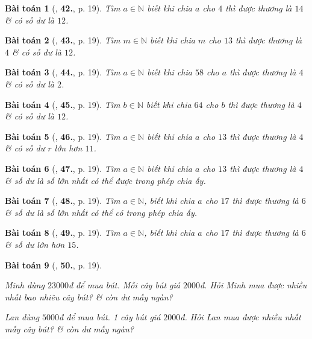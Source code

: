 \documentclass{article}
\numberwithin{equation}{section}
\newtheorem{baitoan}{Bài toán}[section]
\begin{document}
\begin{baitoan}[\cite{Trong_Toan_6_2021}, \textbf{42.}, p. 19]
	Tìm $a\in\mathbb{N}$ biết khi chia $a$ cho $4$ thì được thương là $14$ \& có số dư là $12$.
\end{baitoan}

\begin{baitoan}[\cite{Trong_Toan_6_2021}, \textbf{43.}, p. 19]
	Tìm $m\in\mathbb{N}$ biết khi chia $m$ cho $13$ thì được thương là $4$ \& có số dư là $12$.
\end{baitoan}

\begin{baitoan}[\cite{Trong_Toan_6_2021}, \textbf{44.}, p. 19]
	Tìm $a\in\mathbb{N}$ biết khi chia $58$ cho $a$ thì được thương là $4$ \& có số dư là $2$.
\end{baitoan}

\begin{baitoan}[\cite{Trong_Toan_6_2021}, \textbf{45.}, p. 19]
	Tìm $b\in\mathbb{N}$ biết khi chia $64$ cho $b$ thì được thương là $4$ \& có số dư là $12$.
\end{baitoan}

\begin{baitoan}[\cite{Trong_Toan_6_2021}, \textbf{46.}, p. 19]
	Tìm $a\in\mathbb{N}$ biết khi chia $a$ cho $13$ thì được thương là $4$ \& có số dư $r$ lớn hơn $11$.
\end{baitoan}

\begin{baitoan}[\cite{Trong_Toan_6_2021}, \textbf{47.}, p. 19]
	Tìm $a\in\mathbb{N}$ biết khi chia $a$ cho $13$ thì được thương là $4$ \& số dư là số lớn nhất có thể được trong phép chia ấy.
\end{baitoan}

\begin{baitoan}[\cite{Trong_Toan_6_2021}, \textbf{48.}, p. 19]
	Tìm $a\in\mathbb{N}$, biết khi chia $a$ cho $17$ thì được thương là $6$ \& số dư là số lớn nhất có thể có trong phép chia ấy.
\end{baitoan}

\begin{baitoan}[\cite{Trong_Toan_6_2021}, \textbf{49.}, p. 19]
	Tìm $a\in\mathbb{N}$, biết khi chia $a$ cho $17$ thì được thương là $6$ \& số dư lớn hơn $15$.
\end{baitoan}

\begin{baitoan}[\cite{Trong_Toan_6_2021}, \textbf{50.}, p. 19]
	\begin{enumerate*}
		\item Minh dùng $23000$đ để mua bút. Mỗi cây bút giá $2000$đ. Hỏi Minh mua được nhiều nhất bao nhiêu cây bút? \& còn dư mấy ngàn?
		\item Lan dùng $5000$đ để mua bút. 1 cây bút giá $2000$đ. Hỏi Lan mua được nhiều nhất mấy cây bút? \& còn dư mấy ngàn?
	\end{enumerate*}
\end{baitoan}
\end{document}
